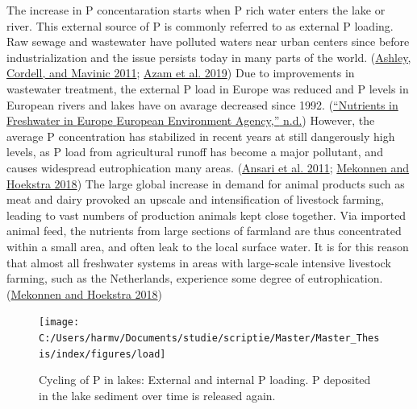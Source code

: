 \documentclass[a4paper,11pt]{article}
\begin{document}
The increase in P concentaration starts when P rich water enters the lake or river. This external source of P is commonly referred to as external P loading. Raw sewage and wastewater have polluted waters near urban centers since before industrialization and the issue persists today in many parts of the world. (\protect\hyperlink{ref-ashleyBriefHistoryPhosphorus2011}{Ashley, Cordell, and Mavinic 2011}; \protect\hyperlink{ref-azamPhosphorousEnvironmentCharacteristics2019}{Azam et al. 2019}) Due to improvements in wastewater treatment, the external P load in Europe was reduced and P levels in European rivers and lakes have on avarage decreased since 1992. (\protect\hyperlink{ref-NutrientsFreshwaterEurope}{{``Nutrients in Freshwater in {Europe} {} {European Environment Agency},''} n.d.}) However, the average P concentration has stabilized in recent years at still dangerously high levels, as P load from agricultural runoff has become a major pollutant, and causes widespread eutrophication many areas. (\protect\hyperlink{ref-ansariEutrophicationCausesConsequences2011}{Ansari et al. 2011}; \protect\hyperlink{ref-mekonnenGlobalAnthropogenicPhosphorus2018}{Mekonnen and Hoekstra 2018}) The large global increase in demand for animal products such as meat and dairy provoked an upscale and intensification of livestock farming, leading to vast numbers of production animals kept close together. Via imported animal feed, the nutrients from large sections of farmland are thus concentrated within a small area, and often leak to the local surface water. It is for this reason that almost all freshwater systems in areas with large-scale intensive livestock farming, such as the Netherlands, experience some degree of eutrophication. (\protect\hyperlink{ref-mekonnenGlobalAnthropogenicPhosphorus2018}{Mekonnen and Hoekstra 2018})
\begin{figure}

{\centering \texttt{[image: C:/Users/harmv/Documents/studie/scriptie/Master/Master\_Thesis/index/figures/load]} 

}

\caption{Cycling of  P in lakes: External and internal P loading. P deposited in the lake sediment over time is released again.}\label{fig:intern}
\end{figure}
\end{document}
